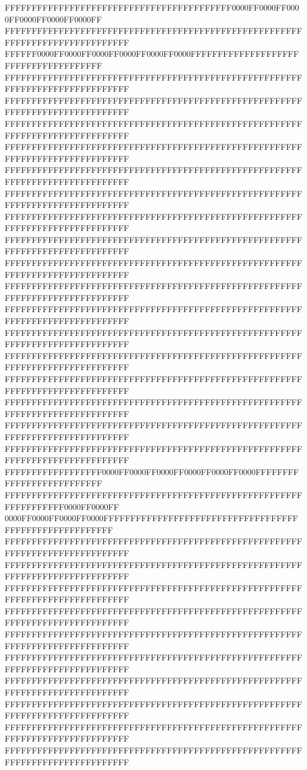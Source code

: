 FFFFFFFFFFFFFFFFFFFFFFFFFFFFFFFFFFFFFFFFFF0000FF0000FF0000FF0000FF0000FF0000FF
FFFFFFFFFFFFFFFFFFFFFFFFFFFFFFFFFFFFFFFFFFFFFFFFFFFFFFFFFFFFFFFFFFFFFFFFFFFFFF
FFFFFF0000FF0000FF0000FF0000FF0000FF0000FFFFFFFFFFFFFFFFFFFFFFFFFFFFFFFFFFFFFF
FFFFFFFFFFFFFFFFFFFFFFFFFFFFFFFFFFFFFFFFFFFFFFFFFFFFFFFFFFFFFFFFFFFFFFFFFFFFFF
FFFFFFFFFFFFFFFFFFFFFFFFFFFFFFFFFFFFFFFFFFFFFFFFFFFFFFFFFFFFFFFFFFFFFFFFFFFFFF
FFFFFFFFFFFFFFFFFFFFFFFFFFFFFFFFFFFFFFFFFFFFFFFFFFFFFFFFFFFFFFFFFFFFFFFFFFFFFF
FFFFFFFFFFFFFFFFFFFFFFFFFFFFFFFFFFFFFFFFFFFFFFFFFFFFFFFFFFFFFFFFFFFFFFFFFFFFFF
FFFFFFFFFFFFFFFFFFFFFFFFFFFFFFFFFFFFFFFFFFFFFFFFFFFFFFFFFFFFFFFFFFFFFFFFFFFFFF
FFFFFFFFFFFFFFFFFFFFFFFFFFFFFFFFFFFFFFFFFFFFFFFFFFFFFFFFFFFFFFFFFFFFFFFFFFFFFF
FFFFFFFFFFFFFFFFFFFFFFFFFFFFFFFFFFFFFFFFFFFFFFFFFFFFFFFFFFFFFFFFFFFFFFFFFFFFFF
FFFFFFFFFFFFFFFFFFFFFFFFFFFFFFFFFFFFFFFFFFFFFFFFFFFFFFFFFFFFFFFFFFFFFFFFFFFFFF
FFFFFFFFFFFFFFFFFFFFFFFFFFFFFFFFFFFFFFFFFFFFFFFFFFFFFFFFFFFFFFFFFFFFFFFFFFFFFF
FFFFFFFFFFFFFFFFFFFFFFFFFFFFFFFFFFFFFFFFFFFFFFFFFFFFFFFFFFFFFFFFFFFFFFFFFFFFFF
FFFFFFFFFFFFFFFFFFFFFFFFFFFFFFFFFFFFFFFFFFFFFFFFFFFFFFFFFFFFFFFFFFFFFFFFFFFFFF
FFFFFFFFFFFFFFFFFFFFFFFFFFFFFFFFFFFFFFFFFFFFFFFFFFFFFFFFFFFFFFFFFFFFFFFFFFFFFF
FFFFFFFFFFFFFFFFFFFFFFFFFFFFFFFFFFFFFFFFFFFFFFFFFFFFFFFFFFFFFFFFFFFFFFFFFFFFFF
FFFFFFFFFFFFFFFFFFFFFFFFFFFFFFFFFFFFFFFFFFFFFFFFFFFFFFFFFFFFFFFFFFFFFFFFFFFFFF
FFFFFFFFFFFFFFFFFFFFFFFFFFFFFFFFFFFFFFFFFFFFFFFFFFFFFFFFFFFFFFFFFFFFFFFFFFFFFF
FFFFFFFFFFFFFFFFFFFFFFFFFFFFFFFFFFFFFFFFFFFFFFFFFFFFFFFFFFFFFFFFFFFFFFFFFFFFFF
FFFFFFFFFFFFFFFFFFFFFFFFFFFFFFFFFFFFFFFFFFFFFFFFFFFFFFFFFFFFFFFFFFFFFFFFFFFFFF
FFFFFFFFFFFFFFFFFF0000FF0000FF0000FF0000FF0000FF0000FFFFFFFFFFFFFFFFFFFFFFFFFF
FFFFFFFFFFFFFFFFFFFFFFFFFFFFFFFFFFFFFFFFFFFFFFFFFFFFFFFFFFFFFFFFFF0000FF0000FF
0000FF0000FF0000FF0000FFFFFFFFFFFFFFFFFFFFFFFFFFFFFFFFFFFFFFFFFFFFFFFFFFFFFFFF
FFFFFFFFFFFFFFFFFFFFFFFFFFFFFFFFFFFFFFFFFFFFFFFFFFFFFFFFFFFFFFFFFFFFFFFFFFFFFF
FFFFFFFFFFFFFFFFFFFFFFFFFFFFFFFFFFFFFFFFFFFFFFFFFFFFFFFFFFFFFFFFFFFFFFFFFFFFFF
FFFFFFFFFFFFFFFFFFFFFFFFFFFFFFFFFFFFFFFFFFFFFFFFFFFFFFFFFFFFFFFFFFFFFFFFFFFFFF
FFFFFFFFFFFFFFFFFFFFFFFFFFFFFFFFFFFFFFFFFFFFFFFFFFFFFFFFFFFFFFFFFFFFFFFFFFFFFF
FFFFFFFFFFFFFFFFFFFFFFFFFFFFFFFFFFFFFFFFFFFFFFFFFFFFFFFFFFFFFFFFFFFFFFFFFFFFFF
FFFFFFFFFFFFFFFFFFFFFFFFFFFFFFFFFFFFFFFFFFFFFFFFFFFFFFFFFFFFFFFFFFFFFFFFFFFFFF
FFFFFFFFFFFFFFFFFFFFFFFFFFFFFFFFFFFFFFFFFFFFFFFFFFFFFFFFFFFFFFFFFFFFFFFFFFFFFF
FFFFFFFFFFFFFFFFFFFFFFFFFFFFFFFFFFFFFFFFFFFFFFFFFFFFFFFFFFFFFFFFFFFFFFFFFFFFFF
FFFFFFFFFFFFFFFFFFFFFFFFFFFFFFFFFFFFFFFFFFFFFFFFFFFFFFFFFFFFFFFFFFFFFFFFFFFFFF
FFFFFFFFFFFFFFFFFFFFFFFFFFFFFFFFFFFFFFFFFFFFFFFFFFFFFFFFFFFFFFFFFFFFFFFFFFFFFF
